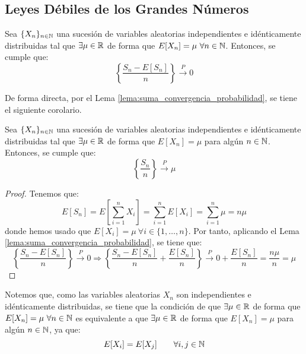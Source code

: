 \subsection{Leyes Débiles de los Grandes Números}
\begin{prop}
    Sea $\{X_n\}_{n\in \mathbb{N}}$ una sucesión de variables aleatorias independientes e idénticamente distribuidas tal que $\exists \mu\in \mathbb{R}$ de forma que $E[X_n]=\mu~\forall n\in \mathbb{N}$. Entonces, se cumple que:
    \begin{equation*}
        \left\{\frac{S_n-E[S_n]}{n}\right\} \xrightarrow{P} 0
    \end{equation*}
\end{prop}

De forma directa, por el Lema \ref{lema:suma_convergencia_probabilidad}, se tiene el siguiente corolario.
\begin{coro}
    Sea $\{X_n\}_{n\in \mathbb{N}}$ una sucesión de variables aleatorias independientes e idénticamente distribuidas tal que $\exists \mu\in \mathbb{R}$ de forma que $E[X_n]=\mu$ para algún $n\in \mathbb{N}$. Entonces, se cumple que:
    \begin{equation*}
        \left\{\frac{S_n}{n}\right\} \xrightarrow{P} \mu
    \end{equation*}
\end{coro}
\begin{proof}
    Tenemos que:
    \begin{equation*}
        E[S_n] = E\left[\sum_{i=1}^{n} X_i\right] = \sum_{i=1}^{n} E[X_i] = \sum_{i=1}^{n} \mu = n\mu
    \end{equation*}
    donde hemos usado que $E[X_i]=\mu~\forall i\in \{1,\ldots,n\}$. Por tanto, aplicando el Lema \ref{lema:suma_convergencia_probabilidad}, se tiene que:
    \begin{equation*}
        \left\{\frac{S_n-E[S_n]}{n}\right\} \xrightarrow{P} 0 \Longrightarrow 
        \left\{\frac{S_n-E[S_n]}{n}+\frac{E[S_n]}{n}\right\} \xrightarrow{P} 0+\frac{E[S_n]}{n}=\frac{n\mu}{n}=\mu
    \end{equation*}
\end{proof}
\begin{observacion}
    Notemos que, como las variables aleatorias $X_n$ son independientes e idénticamente distribuidas, se tiene que la condición de que $\exists \mu\in \mathbb{R}$ de forma que $E[X_n]=\mu~\forall n\in \mathbb{N}$ es equivalente a que $\exists \mu\in \mathbb{R}$ de forma que $E[X_n]=\mu$ para algún $n\in \mathbb{N}$, ya que:
    \begin{equation*}
        E[X_i]=E[X_j]\qquad \forall i,j\in \mathbb{N}
    \end{equation*}
\end{observacion}

